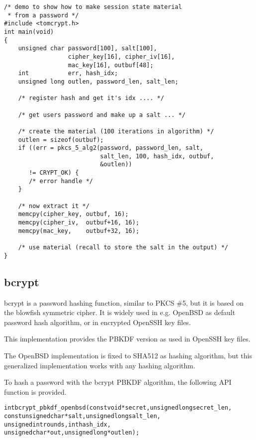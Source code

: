 \documentclass[synpaper]{book}
\begin{document}
\begin{verbatim}
/* demo to show how to make session state material
 * from a password */
#include <tomcrypt.h>
int main(void)
{
    unsigned char password[100], salt[100],
                  cipher_key[16], cipher_iv[16],
                  mac_key[16], outbuf[48];
    int           err, hash_idx;
    unsigned long outlen, password_len, salt_len;

    /* register hash and get it's idx .... */

    /* get users password and make up a salt ... */

    /* create the material (100 iterations in algorithm) */
    outlen = sizeof(outbuf);
    if ((err = pkcs_5_alg2(password, password_len, salt,
                           salt_len, 100, hash_idx, outbuf,
                           &outlen))
       != CRYPT_OK) {
       /* error handle */
    }

    /* now extract it */
    memcpy(cipher_key, outbuf, 16);
    memcpy(cipher_iv,  outbuf+16, 16);
    memcpy(mac_key,    outbuf+32, 16);

    /* use material (recall to store the salt in the output) */
}
\end{verbatim}


\subsection{bcrypt}

bcrypt is a password hashing function, similar to PKCS \#5, but it is based on the blowfish symmetric cipher.
It is widely used in e.g. OpenBSD as default password hash algorithm, or in encrypted OpenSSH key files.

This implementation provides the PBKDF version as used in OpenSSH key files.

The OpenBSD implementation is fixed to SHA512 as hashing algorithm, but this generalized implementation works with any hashing algorithm.

To hash a password with the bcrypt PBKDF algorithm, the following API function is provided.

\begin{alltt}
int bcrypt_pbkdf_openbsd(const          void *secret, unsigned long secret_len,
                         const unsigned char *salt,   unsigned long salt_len,
                               unsigned int  rounds,            int hash_idx,
                               unsigned char *out,    unsigned long *outlen);
\end{alltt}
\end{document}
